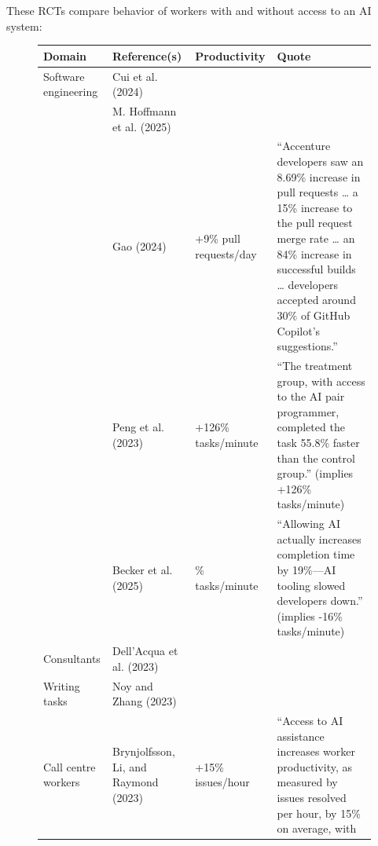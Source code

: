 \documentclass[
  letterpaper,
  DIV=11,
  numbers=noendperiod,
  oneside]{scrartcl}
\begin{document}
These RCTs compare behavior of workers with and without access to an AI
system:

\begin{figure}

\begin{longtable}[]{@{}
  >{\raggedright\arraybackslash}p{}
  >{\raggedright\arraybackslash}p{}
  >{\raggedright\arraybackslash}p{}
  >{\raggedright\arraybackslash}p{}@{}}
\toprule\noalign{}
\begin{minipage}[b]{\linewidth}\raggedright
Domain
\end{minipage} & \begin{minipage}[b]{\linewidth}\raggedright
Reference(s)
\end{minipage} & \begin{minipage}[b]{\linewidth}\raggedright
Productivity
\end{minipage} & \begin{minipage}[b]{\linewidth}\raggedright
Quote
\end{minipage} \\
\midrule\noalign{}
\endhead
\bottomrule\noalign{}
\endlastfoot
Software engineering & Cui et al. (2024) & & \\
& M. Hoffmann et al. (2025) & & \\
& Gao (2024) & +9\% pull requests/day & ``Accenture developers saw an
8.69\% increase in pull requests \ldots{} a 15\% increase to the pull
request merge rate \ldots{} an 84\% increase in successful builds
\ldots{} developers accepted around 30\% of GitHub Copilot's
suggestions.'' \\
& Peng et al. (2023) & +126\% tasks/minute & ``The treatment group, with
access to the AI pair programmer, completed the task 55.8\% faster than
the control group.'' (implies +126\% tasks/minute) \\
& Becker et al. (2025) & -16\% tasks/minute & ``Allowing AI actually
increases completion time by 19\%---AI tooling slowed developers down.''
(implies -16\% tasks/minute) \\
Consultants & Dell'Acqua et al. (2023) & & \\
Writing tasks & Noy and Zhang (2023) & & \\
Call centre workers & Brynjolfsson, Li, and Raymond (2023) & +15\%
issues/hour & ``Access to AI assistance increases worker productivity,
as measured by issues resolved per hour, by 15\% on average, with

\end{longtable}
\end{figure}
\end{document}
